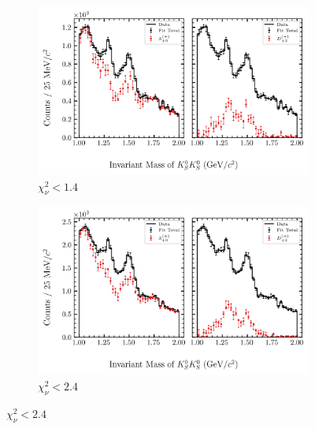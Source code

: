 \begin{figure}[htbp]
    \centering
    \begin{subfigure}{0.45\textwidth}
        \includegraphics[width=\linewidth]{figures/binned_fit_chisqdof_1.4_splot_D_1s_2b_phase_factor_waves491_uncertainty_bootstrap-CI-BC.png}
        \caption{$\chi^2_\nu < 1.4$}
    \end{subfigure}
    \hfill
    \begin{subfigure}{0.45\textwidth}
        \includegraphics[width=\linewidth]{figures/binned_fit_chisqdof_2.4_splot_D_1s_2b_phase_factor_waves491_uncertainty_bootstrap-CI-BC.png}
        \caption{$\chi^2_\nu < 2.4$}
    \end{subfigure}

    \vspace{1em}


\end{figure}
